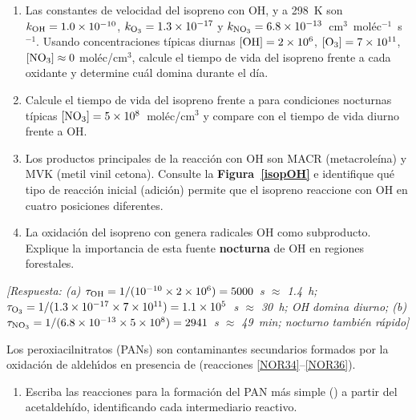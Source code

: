 \begin{bloque_ejercicios}
\begin{ejercicios}
\begin{enumerate}[label=\alph*)]
    \item Las constantes de velocidad del isopreno con OH,
           y  a \SI{298}{\kelvin} son
          $k_{\ce{OH}} = 1.0\times10^{-10}$,
          $k_{\ce{O3}} = 1.3\times10^{-17}$ y
          $k_{\ce{NO3}} = 6.8\times10^{-13}$~cm$^3$~mol\'ec$^{-1}$~s$^{-1}$.
          Usando concentraciones t\'ipicas diurnas
          $[\ce{OH}] = 2\times10^6$,
          $[\ce{O3}] = 7\times10^{11}$,
          $[\ce{NO3}] \approx 0$ mol\'ec/cm$^3$,
          calcule el tiempo de vida del isopreno frente
          a cada oxidante y determine cu\'al domina durante el d\'ia.

    \item Calcule el tiempo de vida del isopreno frente a
           para condiciones nocturnas t\'ipicas
          $[\ce{NO3}] = 5\times10^8$~mol\'ec/cm$^3$
          y compare con el tiempo de vida diurno frente a OH.

    \item Los productos principales de la reacci\'on con OH
          son MACR (metacrole\'ina) y MVK (metil vinil cetona).
          Consulte la \textbf{Figura~\ref{isopOH}} e identifique
          qu\'e tipo de reacci\'on inicial (adici\'on) permite
          que el isopreno reaccione con OH en cuatro posiciones
          diferentes.

    \item La oxidaci\'on del isopreno con  genera
          radicales OH como subproducto. Explique la
          importancia de esta fuente \textbf{nocturna} de OH
          en regiones forestales.
\end{enumerate}

\textit{[Respuesta:
(a) $\tau_{\ce{OH}} = 1/(10^{-10}\times2\times10^6)
    = 5000$~s $\approx$ 1.4~h;
    $\tau_{\ce{O3}} = 1/(1.3\times10^{-17}\times7\times10^{11})
    = 1.1\times10^5$~s $\approx$ 30~h; OH domina diurno;
(b) $\tau_{\ce{NO3}} = 1/(6.8\times10^{-13}
    \times5\times10^8) = 2941$~s $\approx$ 49~min; nocturno tambi\'en r\'apido]}

\item Los peroxiacilnitratos (PANs) son contaminantes secundarios
formados por la oxidaci\'on de aldeh\'{\i}dos en presencia de
 (reacciones \ref{NOR34}--\ref{NOR36}).

\begin{enumerate}[label=\alph*)]
    \item Escriba las reacciones para la formaci\'on del PAN
          m\'as simple () a partir del
          acetaldeh\'ido, identificando cada intermediario
          reactivo.


\end{enumerate}
\end{ejercicios}
\end{bloque_ejercicios}
